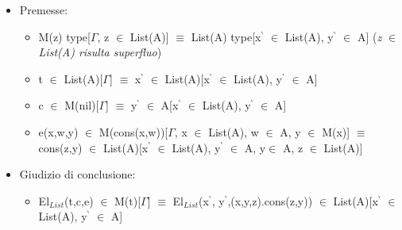 \begin{itemize}
\item Premesse:
\begin{itemize}
\item M(z) type[$\Gamma$, z $\in$ List(A)] $\equiv$ List(A) type[x$^\backprime$ $\in$ List(A), y$^\backprime$ $\in$ A] (\textit{z $\in$ List(A) risulta superfluo})
\item t $\in$ List(A)[$\Gamma$] $\equiv$ x$^\backprime$ $\in$ List(A)[x$^\backprime$ $\in$ List(A), y$^\backprime$ $\in$ A]
\item c $\in$ M(nil)[$\Gamma$] $\equiv$ y$^\backprime$ $\in$ A[x$^\backprime$ $\in$ List(A), y$^\backprime$ $\in$ A]
\item e(x,w,y) $\in$ M(cons(x,w))[$\Gamma$, x $\in$ List(A),  w $\in$ A, y $\in$ M(x)] $\equiv$
cons(z,y) $\in$ List(A)[x$^\backprime$ $\in$ List(A), y$^\backprime$ $\in$ A, y$\in$ A, z $\in$ List(A)]
\end{itemize}
\noindent
\item Giudizio di conclusione:
\begin{itemize}
\item El$_{List}$(t,c,e) $\in$ M(t)[$\Gamma$] $\equiv$ El$_{List}$(x$^\backprime$, y$^\backprime$,(x,y,z).cons(z,y)) $\in$ List(A)[x$^\backprime$ $\in$ List(A), y$^\backprime$ $\in$ A]
\end{itemize}
\end{itemize}

